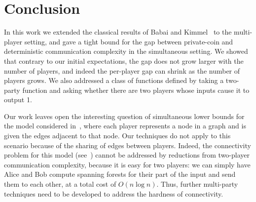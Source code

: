 \section{Conclusion}
In this work we extended the classical results of Babai and Kimmel~\cite{BK97} to the multi-player setting,
and gave a tight bound for the gap between private-coin and deterministic communication complexity
in the simultaneous setting.
We showed that contrary to our initial expectations, the gap does not grow larger with the number of players,
and indeed the per-player gap can shrink as the number of players grows.
We also addressed a class of functions defined by taking a two-party function and asking whether there are two players
whose inputs cause it to output 1.

Our work leaves open the interesting question of simultaneous lower bounds for the model considered in~\cite{AGM12,BMNRST14,BPRT14},
where each player represents a node in a graph and is given the edges adjacent to that node.
Our techniques do not apply to this scenario because of the sharing of edges between players.
Indeed, the connectivity problem for this model (see~\cite{OpenProblem65}) cannot be addressed by reductions from two-player communication complexity,
because it is easy for two players: 
we can simply have Alice and Bob compute spanning forests for their part of the input and send them to each other,
at a total cost of $O(n \log n)$.
Thus, further multi-party techniques need to be developed to address the hardness of connectivity.
